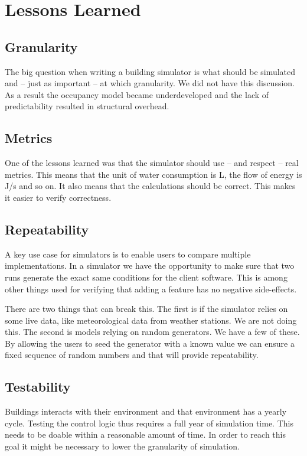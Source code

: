 \documentclass[10pt]{article}
\begin{document}
\section{Lessons Learned}
\label{sec:lessons}

\subsection{Granularity}

The big question when writing a building simulator is what should be simulated and -- just as important -- at which granularity. We did not have this discussion. As a result the occupancy model became underdeveloped and the lack of predictability resulted in structural overhead.

\subsection{Metrics}

One of the lessons learned was that the simulator should use -- and respect -- real metrics. This means that the unit of water consumption is L, the flow of energy is J/s and so on. It also means that the calculations should be correct. This makes it easier to verify correctness.

\subsection{Repeatability}

A key use case for simulators is to enable users to compare multiple implementations. In a simulator we have the opportunity to make sure that two runs generate the exact same conditions for the client software. This is among other things used for verifying that adding a feature has no negative side-effects.

There are two things that can break this. The first is if the simulator relies on some live data, like meteorological data from weather stations. We are not doing this. The second is models relying on random generators. We have a few of these. By allowing the users to seed the generator with a known value we can ensure a fixed sequence of random numbers and that will provide repeatability.

\subsection{Testability}

Buildings interacts with their environment and that environment has a yearly cycle. Testing the control logic thus requires a full year of simulation time. This needs to be doable within a reasonable amount of time. In order to reach this goal it might be necessary to lower the granularity of simulation.
\end{document}
